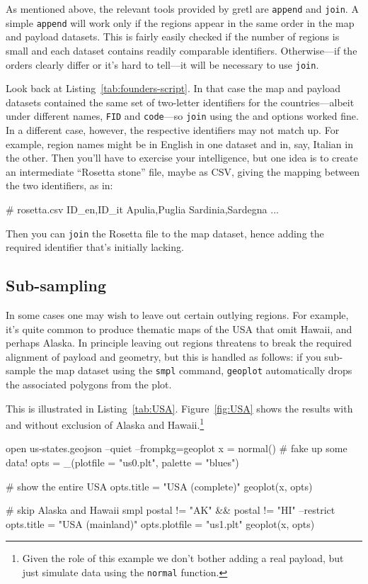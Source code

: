 \documentclass{article}
\begin{document}
As mentioned above, the relevant tools provided by gretl are
\texttt{append} and \texttt{join}. A simple \texttt{append} will work
only if the regions appear in the same order in the map and payload
datasets. This is fairly easily checked if the number of regions is
small and each dataset contains readily comparable
identifiers. Otherwise---if the orders clearly differ or it's hard to
tell---it will be necessary to use \texttt{join}.

Look back at Listing~\ref{tab:founders-script}. In that case the map
and payload datasets contained the same set of two-letter identifiers
for the countries---albeit under different names, \texttt{FID} and
\texttt{code}---so \texttt{join} using the  and
 options worked fine. In a different case, however, the
respective identifiers may not match up. For example, region names
might be in English in one dataset and in, say, Italian in the
other. Then you'll have to exercise your intelligence, but one idea is
to create an intermediate ``Rosetta stone'' file, maybe as CSV, giving
the mapping between the two identifiers, as in:
\begin{code}
# rosetta.csv
ID_en,ID_it
Apulia,Puglia
Sardinia,Sardegna
...
\end{code}
Then you can \texttt{join} the Rosetta file to the map dataset, hence
adding the required identifier that's initially lacking.

\subsection{Sub-sampling}
\label{sec:sub-sample}

In some cases one may wish to leave out certain outlying regions. For
example, it's quite common to produce thematic maps of the USA that
omit Hawaii, and perhaps Alaska. In principle leaving out regions
threatens to break the required alignment of payload and geometry, but
this is handled as follows: if you sub-sample the map dataset using
the \texttt{smpl} command, \texttt{geoplot} automatically drops the
associated polygons from the plot.

This is illustrated in Listing~\ref{tab:USA}. Figure~\ref{fig:USA}
shows the results with and without exclusion of Alaska and
Hawaii.\footnote{Given the role of this example we don't bother adding
  a real payload, but just simulate data using the \texttt{normal}
  function.}

\begin{script}[p]
  \begin{scode}
open us-states.geojson --quiet --frompkg=geoplot
x = normal() # fake up some data!
opts = _(plotfile = "us0.plt", palette = "blues")

# show the entire USA
opts.title = "USA (complete)"
geoplot(x, opts)

# skip Alaska and Hawaii
smpl postal != "AK" && postal != "HI" --restrict
opts.title = "USA (mainland)"
opts.plotfile = "us1.plt"
geoplot(x, opts)
  \end{scode}
  \caption{US maps, complete vs contiguous states}
  \label{tab:USA}
\end{script}
\end{document}
